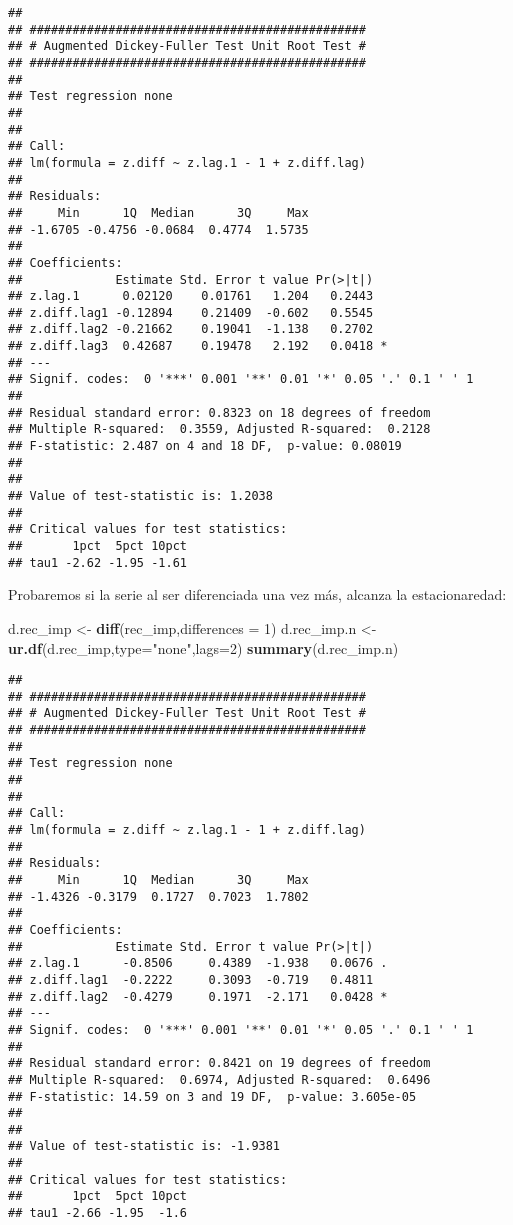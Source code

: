 \documentclass[]{book}
\newenvironment{Shaded}{\begin{snugshade}}{\end{snugshade}}
\newcommand{\KeywordTok}[1]{\textcolor[rgb]{0.13,0.29,0.53}{\textbf{#1}}}
\newcommand{\DataTypeTok}[1]{\textcolor[rgb]{0.13,0.29,0.53}{#1}}
\newcommand{\DecValTok}[1]{\textcolor[rgb]{0.00,0.00,0.81}{#1}}
\newcommand{\StringTok}[1]{\textcolor[rgb]{0.31,0.60,0.02}{#1}}
\newcommand{\NormalTok}[1]{#1}
\theoremstyle{definition}
\theoremstyle{definition}
\theoremstyle{definition}
\theoremstyle{remark}
\begin{document}
\begin{verbatim}
## 
## ############################################### 
## # Augmented Dickey-Fuller Test Unit Root Test # 
## ############################################### 
## 
## Test regression none 
## 
## 
## Call:
## lm(formula = z.diff ~ z.lag.1 - 1 + z.diff.lag)
## 
## Residuals:
##     Min      1Q  Median      3Q     Max 
## -1.6705 -0.4756 -0.0684  0.4774  1.5735 
## 
## Coefficients:
##             Estimate Std. Error t value Pr(>|t|)  
## z.lag.1      0.02120    0.01761   1.204   0.2443  
## z.diff.lag1 -0.12894    0.21409  -0.602   0.5545  
## z.diff.lag2 -0.21662    0.19041  -1.138   0.2702  
## z.diff.lag3  0.42687    0.19478   2.192   0.0418 *
## ---
## Signif. codes:  0 '***' 0.001 '**' 0.01 '*' 0.05 '.' 0.1 ' ' 1
## 
## Residual standard error: 0.8323 on 18 degrees of freedom
## Multiple R-squared:  0.3559, Adjusted R-squared:  0.2128 
## F-statistic: 2.487 on 4 and 18 DF,  p-value: 0.08019
## 
## 
## Value of test-statistic is: 1.2038 
## 
## Critical values for test statistics: 
##       1pct  5pct 10pct
## tau1 -2.62 -1.95 -1.61
\end{verbatim}

Probaremos si la serie al ser diferenciada una vez más, alcanza la
estacionaredad:

\begin{Shaded}
\begin{Highlighting}[]
\NormalTok{d.rec_imp <-}\StringTok{ }\KeywordTok{diff}\NormalTok{(rec_imp,}\DataTypeTok{differences =} \DecValTok{1}\NormalTok{)}
\NormalTok{d.rec_imp.n <-}\StringTok{ }\KeywordTok{ur.df}\NormalTok{(d.rec_imp,}\DataTypeTok{type=}\StringTok{"none"}\NormalTok{,}\DataTypeTok{lags=}\DecValTok{2}\NormalTok{)}
\KeywordTok{summary}\NormalTok{(d.rec_imp.n)}
\end{Highlighting}
\end{Shaded}

\begin{verbatim}
## 
## ############################################### 
## # Augmented Dickey-Fuller Test Unit Root Test # 
## ############################################### 
## 
## Test regression none 
## 
## 
## Call:
## lm(formula = z.diff ~ z.lag.1 - 1 + z.diff.lag)
## 
## Residuals:
##     Min      1Q  Median      3Q     Max 
## -1.4326 -0.3179  0.1727  0.7023  1.7802 
## 
## Coefficients:
##             Estimate Std. Error t value Pr(>|t|)  
## z.lag.1      -0.8506     0.4389  -1.938   0.0676 .
## z.diff.lag1  -0.2222     0.3093  -0.719   0.4811  
## z.diff.lag2  -0.4279     0.1971  -2.171   0.0428 *
## ---
## Signif. codes:  0 '***' 0.001 '**' 0.01 '*' 0.05 '.' 0.1 ' ' 1
## 
## Residual standard error: 0.8421 on 19 degrees of freedom
## Multiple R-squared:  0.6974, Adjusted R-squared:  0.6496 
## F-statistic: 14.59 on 3 and 19 DF,  p-value: 3.605e-05
## 
## 
## Value of test-statistic is: -1.9381 
## 
## Critical values for test statistics: 
##       1pct  5pct 10pct
## tau1 -2.66 -1.95  -1.6
\end{verbatim}
\end{document}
